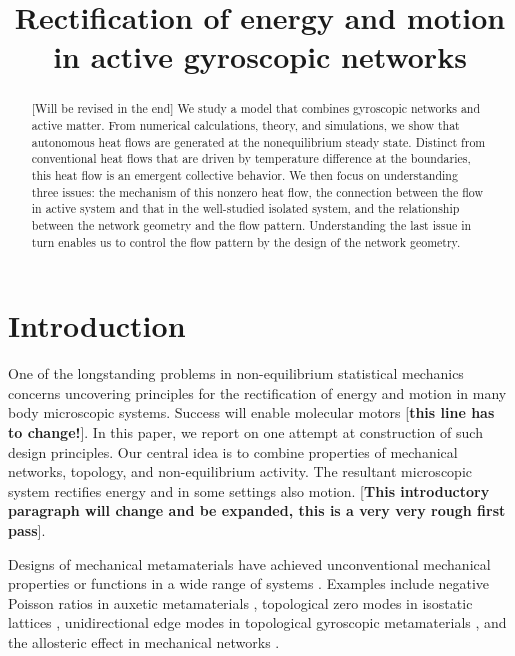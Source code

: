 \documentclass[
 preprint,
 preprintnumbers,
 amsmath,amssymb,
 aps,
 pre,
 longbibliography,
 10pt, twocolumn
]{revtex4-1}
\begin{document}
\newcommand{\eqnname}{Eqn.}
\newcommand{\secname}{Sec.}


\title{Rectification of energy and motion in active gyroscopic networks}



\begin{abstract}
[Will be revised in the end] We study a model that combines gyroscopic networks and active matter. From numerical calculations, theory, and simulations, we show that autonomous heat flows are generated at the nonequilibrium steady state. Distinct from conventional heat flows that are driven by temperature difference at the boundaries, this heat flow is an emergent collective behavior. 
We then focus on understanding three issues: the mechanism of this nonzero heat flow, the connection between the flow in active system and that in the well-studied isolated system, and the relationship between the network geometry and the flow pattern. 
Understanding the last issue in turn enables us to control the flow pattern by the design of the network geometry.
\end{abstract}


\maketitle



\section{Introduction} \label{sec:intro}
One of the longstanding problems in non-equilibrium statistical mechanics concerns uncovering principles for the rectification of energy and motion in many body microscopic systems. Success will enable molecular motors [{\bf this line has to change!}]. In this paper, we report on one attempt at construction of such design principles. Our central idea is to combine properties of mechanical networks, topology, and non-equilibrium activity. The resultant microscopic system rectifies energy and in some settings also motion. [{\bf This introductory paragraph will change and be expanded, this is a very very rough first pass}]. 

Designs of mechanical metamaterials have achieved unconventional mechanical properties or functions in a wide range of systems \cite{Bertoldi2017FlexibleMetamaterials}. Examples include negative Poisson ratios in auxetic metamaterials \cite{Lakes2017Negative-Poissons-RatioSolids,Ren2018AuxeticReview}, topological zero modes in isostatic lattices \cite{Kane2013TopologicalLattices,Lubensky2015PhononsLattices,Paulose2015SelectiveMetamaterials.}, unidirectional edge modes in topological gyroscopic metamaterials \cite{Nash2015TopologicalMetamaterials,Wang2015TopologicalWaves,Mitchell2018AmorphousSets}, and the allosteric effect in mechanical networks \cite{Rocks2017DesigningNetworks.,Yan2017ArchitectureMaterials.,Flechsig2017DesignProteins}. 
\end{document}
